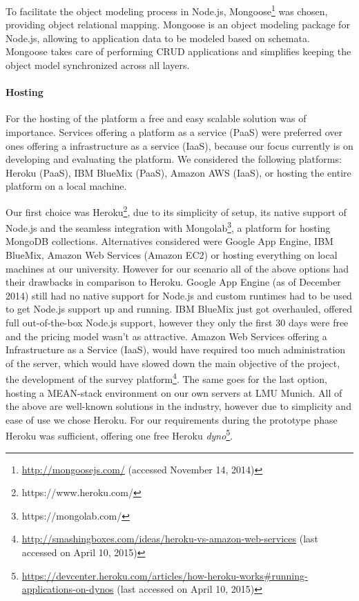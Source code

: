 		To facilitate the object modeling process in Node.js, Mongoose\footnote{\url{http://mongoosejs.com/} (accessed November 14, 2014)} was chosen, providing object relational mapping. Mongoose is an object modeling package for Node.js, allowing to application data to be modeled based on schemata. Mongoose takes care of performing CRUD applications and simplifies keeping the object model synchronized across all layers.


	\paragraph{Hosting}

		For the hosting of the platform a free and easy scalable solution was of importance. Services offering a platform as a service (PaaS) were preferred over ones offering a infrastructure as a service (IaaS), because our focus currently is on developing and evaluating the platform. We considered the following platforms: Heroku (PaaS), IBM BlueMix (PaaS), Amazon AWS (IaaS), or hosting the entire platform on a local machine.

		Our first choice was Heroku\footnote{https://www.heroku.com/}, due to its simplicity of setup, its native support of Node.js and the seamless integration with Mongolab\footnote{https://mongolab.com/}, a platform for hosting MongoDB collections.
		Alternatives considered were Google App Engine, IBM BlueMix, Amazon Web Services (Amazon EC2) or hosting everything on local machines at our university. However for our scenario all of the above options had their drawbacks in comparison to Heroku. Google App Engine (as of December 2014) still had no native support for Node.js and custom runtimes had to be used to get Node.js support up and running. IBM BlueMix just got overhauled, offered full out-of-the-box Node.js support, however they only the first 30 days were free and the pricing model wasn't as attractive. Amazon Web Services offering a Infrastructure as a Service (IaaS), would have required too much administration of the server, which would have slowed down the main objective of the project, the development of the survey platform\footnote{\url{http://smashingboxes.com/ideas/heroku-vs-amazon-web-services} (last accessed on April 10, 2015)}. The same goes for the last option, hosting a MEAN-stack environment on our own servers at LMU Munich. All of the above are well-known solutions in the industry, however due to simplicity and ease of use we chose Heroku. For our requirements during the prototype phase Heroku was sufficient, offering one free Heroku \textit{dyno}\footnote{\url{https://devcenter.heroku.com/articles/how-heroku-works\#running-applications-on-dynos} (last accessed on April 10, 2015)}.



